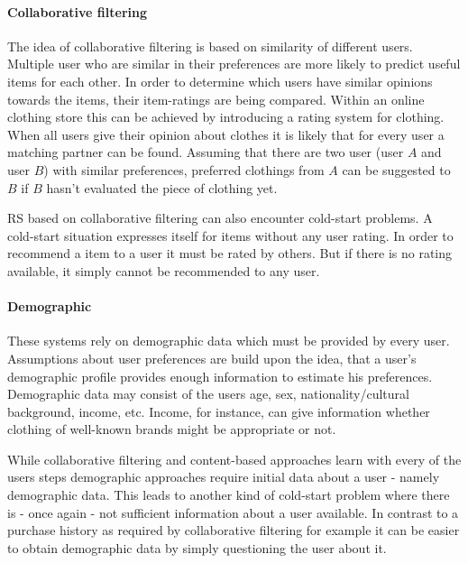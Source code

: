 \paragraph{Collaborative filtering}
The idea of collaborative filtering is based on similarity of different users.
Multiple user who are similar in their preferences are more likely to predict useful items for each other.
In order to determine which users have similar opinions towards the items, their item-ratings are being compared.
\citep[p.~291-292]{schafer:2007}
Within an online clothing store this can be achieved by introducing a rating system for clothing.
When all users give their opinion about clothes it is likely that for every user a matching partner can be found.
Assuming that there are two user (user $A$ and user $B$) with similar preferences, preferred clothings from $A$ can be suggested to $B$ if $B$ hasn't evaluated the piece of clothing yet.

RS based on collaborative filtering can also encounter cold-start problems.
A cold-start situation expresses itself for items without any user rating.
In order to recommend a item to a user it must be rated by others.
But if there is no rating available, it simply cannot be recommended to any user.
\citep[p.~378-379]{burke:2007}

\paragraph{Demographic}
These systems rely on demographic data which must be provided by every user.
Assumptions about user preferences are build upon the idea, that a user's demographic profile provides enough information to estimate his preferences.
Demographic data may consist of the users age, sex, nationality/cultural background, income, etc.\citep[p.~12]{ricci:2011}
Income, for instance, can give information whether clothing of well-known brands might be appropriate or not.

While collaborative filtering and content-based approaches learn with every of the users steps demographic approaches require initial data about a user - namely demographic data.
This leads to another kind of cold-start problem where there is - once again - not sufficient information about a user available.
In contrast to a purchase history as required by collaborative filtering for example it can be easier to obtain demographic data by simply questioning the user about it.

